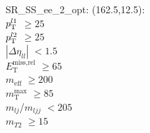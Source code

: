 SR\_SS\_ee\_2\_opt: (162.5,12.5): \\
$p_{\text{T}}^{l1}$ $\geq 25$ \\
$p_{\text{T}}^{l2}$ $\geq 25$ \\
$|\Delta\eta_{ll}|$ $<1.5$ \\
$E_{\text{T}}^{\text{miss,rel}}$ $\geq 65$ \\
$m_{\text{eff}}$ $\geq 200$ \\
$m_{\text{T}}^{\text{max}}$ $\geq 85$ \\
$m_{lj}$/$m_{ljj}$ $<205$ \\
$m_{T2}$ $\geq 15$ \\
